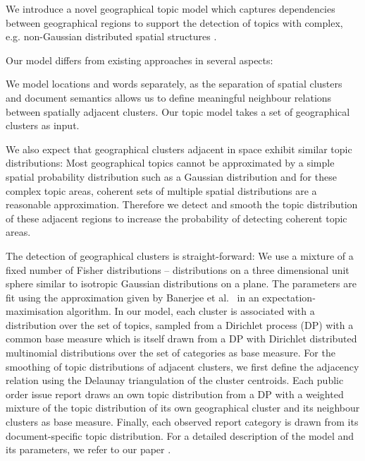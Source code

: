 We introduce a novel geographical topic model which captures dependencies
between geographical regions to support the detection of topics with complex,
e.g. non-Gaus\-sian distributed spatial structures \cite{CCK1}.

Our model differs from existing approaches in several aspects:

We model locations and words separately, as the separation of spatial clusters
and document semantics allows us to define meaningful neighbour relations
between spatially adjacent clusters. Our topic model takes a set of geographical
clusters as input.

We also expect that geographical clusters adjacent in space exhibit similar
topic distributions: Most geographical topics cannot be approximated by a simple
spatial probability distribution such as a Gaussian distribution and for these
complex topic areas, coherent sets of multiple spatial distributions are a
reasonable approximation.  Therefore we detect and smooth the topic distribution
of these adjacent regions to increase the probability of detecting coherent
topic areas.

The detection of geographical clusters is straight-forward: We use a mixture of
a fixed number of Fisher distributions -- distributions on a three dimensional
unit sphere similar to isotropic Gaussian distributions on a plane. The
parameters are fit using the approximation given by Banerjee et
al.~\cite{DBLP:journals/jmlr/BanerjeeDGS05} in an expectation-maximisation
algorithm.  In our model, each cluster is associated with a distribution over
the set of topics, sampled from a Dirichlet process (DP) with a common base
measure which is itself drawn from a DP with Dirichlet distributed multinomial
distributions over the set of categories as base measure.  For the smoothing of
topic distributions of adjacent clusters, we first define the adjacency relation
using the Delaunay triangulation \cite{journals/csur/Aurenhammer91} of the
cluster centroids.  Each public order issue report draws an own topic
distribution from a DP with a weighted mixture of the topic distribution of its
own geographical cluster and its neighbour clusters as base measure.  Finally,
each observed report category is drawn from its document-specific topic
distribution.  For a detailed description of the model and its parameters, we
refer to our paper \cite{CCK1}.

